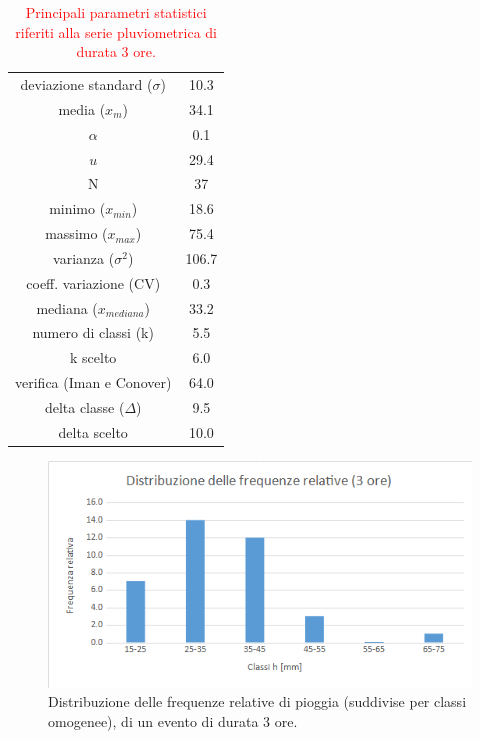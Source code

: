 \begin{table}[H] \centering
        \caption{\textcolor{red}{Principali parametri statistici riferiti alla serie pluviometrica di durata 3 ore.}}
     \begin{tabular}{cc}
        \toprule
    deviazione standard ($\sigma$) & 10.3 \\
    media ($x_m$)              & 34.1 \\
    $\alpha$            &  0.1 \\
    $u$           & 29.4\\
    N                & 37 \\
    minimo ($x_{min}$)      & 18.6 \\
    massimo ($x_{max}$)     & 75.4 \\
    varianza ($\sigma^2$)            & 106.7 \\
    coeff. variazione (CV)    &  0.3\\
    mediana ($x_{mediana}$)        & 33.2 \\
    numero di classi (k)      & 5.5  \\
    k scelto                 &  6.0 \\
    verifica (Iman e Conover) & 64.0 \\
    delta classe ($\Delta$)          & 9.5  \\
    delta scelto             & 10.0 \\
            \bottomrule
            \end{tabular}
    \end{table}

\begin{figure}[H]\centering
        \includegraphics[scale=.6]{immagini/freq_piogg_rel_3ore.png}
        \caption{Distribuzione delle frequenze relative di pioggia (suddivise per classi omogenee), di un evento di durata 3 ore.}
      \label{freq_rel_piogg_05ore}
\end{figure}
    
